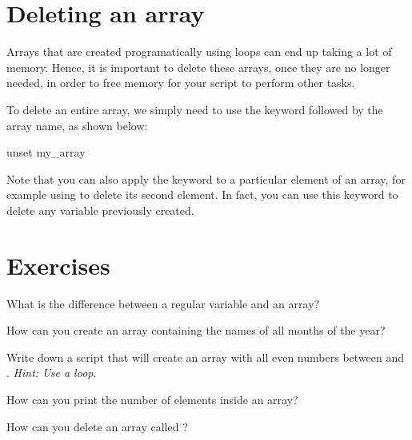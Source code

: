 \section{Deleting an array}

Arrays that are created programatically using loops can end up taking a lot of memory. Hence, it is important to delete these arrays, once they are no longer needed, in order to free memory for your script to perform other tasks.

To delete an entire array, we simply need to use the  keyword followed by the array name, as shown below:
\begin{command_line}
unset my_array
\end{command_line}
Note that you can also apply the  keyword to a particular element of an array, for example using  to delete its second element. In fact, you can use this keyword to delete any variable previously created.


\section*{Exercises}

\begin{exercises}
   \item What is the difference between a regular variable and an array?
   \item How can you create an array containing the names of all months of the year?
   \item Write down a script that will create an array with all even numbers between  and . \textit{Hint: Use a loop}.
   \item How can you print the number of elements inside an array?
   \item How can you delete an array called ?
\end{exercises}